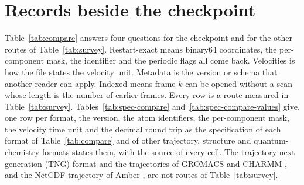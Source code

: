 \documentclass[preprint,12pt]{elsarticle}
\begin{document}
\FloatBarrier \section{Records beside the checkpoint}\label{sec:supp-neighbors} Table~\ref{tab:compare} answers four questions for the checkpoint and for the other routes of Table~\ref{tab:survey}.
Restart-exact means binary64 coordinates, the per-component mask, the identifier and the periodic flags all come back.
Velocities is how the file states the velocity unit.
Metadata is the version or schema that another reader can apply.
Indexed means frame \(k\) can be opened without a scan whose length is the number of earlier frames.
Every row is a route measured in Table~\ref{tab:survey}.
Tables~\ref{tab:spec-compare} and~\ref{tab:spec-compare-values} give, one row per format, the version, the atom identifiers, the per-component mask, the velocity time unit and the decimal round trip as the specification of each format of Table~\ref{tab:compare} and of other trajectory, structure and quantum-chemistry formats states them, with the source of every cell.
The trajectory next generation (TNG) format and the trajectories of GROMACS and CHARMM \cite{spangbergTrajectoryNgPortable2011,lundborgEfficientExtensibleFormat2014,abrahamGromacsHighPerformance2015,brooksCharmmBiomolecularSimulation2009}, and the NetCDF trajectory of Amber \cite{caseAmberBiomolecularSimulation2005,amberNetcdfConvention2022,rewNetcdfInterfaceScientific1990}, are not routes of Table~\ref{tab:survey}.
\end{document}
